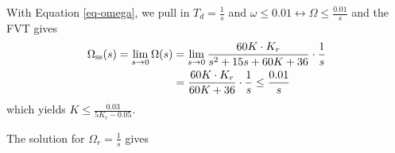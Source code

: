     With Equation \ref{eq-omega}, we pull in $T_d = \frac{1}{s}$ and $\omega\leq 0.01\leftrightarrow \Omega \leq \frac{0.01}{s}$ and the FVT gives
    \begin{align}
        \Omega_{\text{ss}}(s)=\lim_{s\rightarrow 0} \Omega (s) &= \lim_{s\rightarrow 0} \frac{60K\cdot K_r}{s^2 + 15s + 60K+ 36}\cdot \frac{1}{s} \notag\\
        &= \frac{60K\cdot K_r}{60K+36}\cdot \frac{1}{s}\leq \frac{0.01}{s}
    \end{align}
    which yields $\boxed{K \leq \frac{0.03}{5K_r -0.05}}$.

    The solution for $\Omega_r = \frac{1}{s}$ gives
